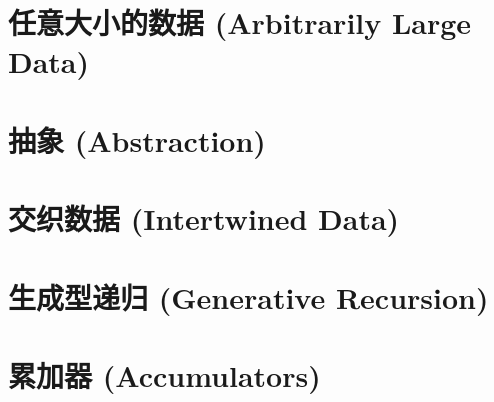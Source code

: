 \documentclass[UTF8,10pt,twocolumn,openany]{ctexbook}
\begin{document}
\part{任意大小的数据 (Arbitrarily Large Data)}








\part{抽象 (Abstraction)}







\part{交织数据 (Intertwined Data)}








\part{生成型递归 (Generative Recursion)}








\part{累加器 (Accumulators)}





\backmatter

\end{document}
